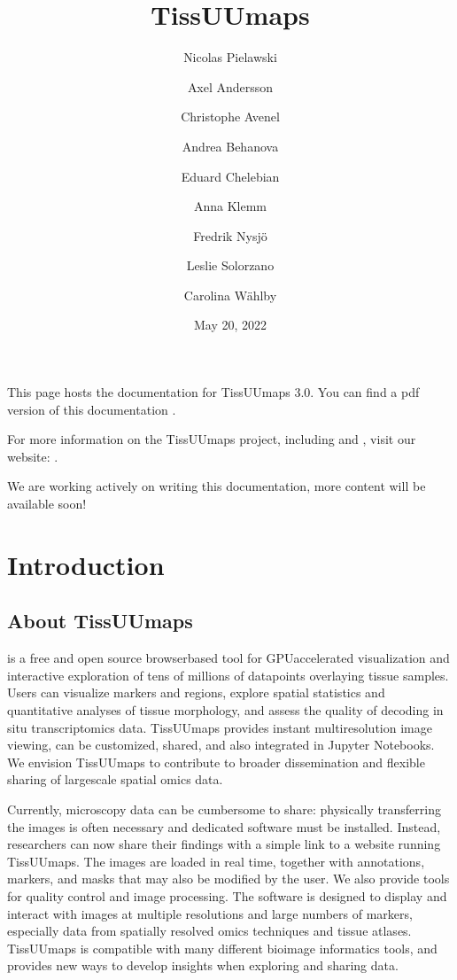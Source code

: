 \documentclass[letterpaper,10pt,english,openany,oneside]{sphinxmanual}
\title{TissUUmaps}
\date{May 20, 2022}
\author{Nicolas Pielawski\and Axel Andersson\and Christophe Avenel\and Andrea Behanova\and Eduard Chelebian\and Anna Klemm\and Fredrik Nysjö\and Leslie Solorzano\and Carolina Wählby}
\begin{document}
\pagestyle{empty}
\sphinxmaketitle
\pagestyle{plain}
\sphinxtableofcontents
\pagestyle{normal}
\label{\detokenize{index::doc}}


\sphinxAtStartPar
This page hosts the documentation for TissUUmaps 3.0. You can find a pdf version of this documentation .

\sphinxAtStartPar
For more information on the TissUUmaps project, including  and , visit our website: .

\begin{sphinxShadowBox}

\sphinxAtStartPar
We are working actively on writing this documentation, more content will be available soon!
\end{sphinxShadowBox}

\sphinxstepscope


\chapter{Introduction}
\label{\detokenize{docs/intro/index:introduction}}\label{\detokenize{docs/intro/index::doc}}
\sphinxstepscope


\section{About TissUUmaps}
\label{\detokenize{docs/intro/about:about-tissuumaps}}\label{\detokenize{docs/intro/about::doc}}
\sphinxAtStartPar
{} is a free and open source browser\sphinxhyphen{}based tool for GPU\sphinxhyphen{}accelerated visualization and interactive exploration of tens of millions of datapoints overlaying tissue samples. Users can visualize markers and regions, explore spatial statistics and quantitative analyses of tissue morphology, and assess the quality of decoding in situ transcriptomics data. TissUUmaps provides instant multi\sphinxhyphen{}resolution image viewing, can be customized, shared, and also integrated in Jupyter Notebooks. We envision TissUUmaps to contribute to broader dissemination and flexible sharing of large\sphinxhyphen{}scale spatial omics data.

\sphinxAtStartPar
Currently, microscopy data can be cumbersome to share: physically transferring the images is often necessary and dedicated software must be installed. Instead, researchers can now share their findings with a simple link to a website running TissUUmaps. The images are loaded in real time, together with annotations, markers, and masks that may also be modified by the user. We also provide tools for quality control and image processing. The software is designed to display and interact with images at multiple resolutions and large numbers of markers, especially data from spatially resolved omics techniques and tissue atlases. TissUUmaps is compatible with many different bioimage informatics tools, and provides new ways to develop insights when exploring and sharing data.
\end{document}

